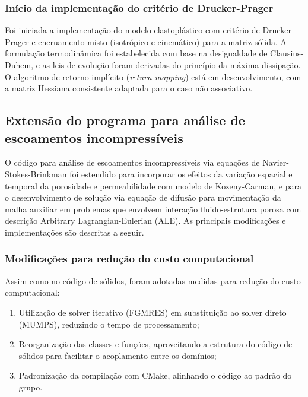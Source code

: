 \subsubsection{Início da implementação do critério de Drucker-Prager}

Foi iniciada a implementação do modelo elastoplástico com critério de Drucker-Prager e encruamento misto (isotrópico e cinemático) para a matriz sólida. A formulação termodinâmica foi estabelecida com base na desigualdade de Clausius-Duhem, e as leis de evolução foram derivadas do princípio da máxima dissipação. O algoritmo de retorno implícito (\textit{return mapping}) está em desenvolvimento, com a matriz Hessiana consistente adaptada para o caso não associativo.

\subsection{Extensão do programa para análise de escoamentos incompressíveis}

O código para análise de escoamentos incompressíveis via equações de Navier-Stokes-Brinkman foi estendido para incorporar os efeitos da variação espacial e temporal da porosidade e permeabilidade com modelo de Kozeny-Carman, e para o desenvolvimento de solução via equação de difusão para movimentação da malha auxiliar em problemas que envolvem interação fluido-estrutura porosa com descrição Arbitrary Lagrangian-Eulerian (ALE). As principais modificações e implementações são descritas a seguir.

\subsubsection{Modificações para redução do custo computacional}

Assim como no código de sólidos, foram adotadas medidas para redução do custo computacional:

\begin{enumerate}
    \item Utilização de solver iterativo (FGMRES) em substituição ao solver direto (MUMPS), reduzindo o tempo de processamento;
    \item Reorganização das classes e funções, aproveitando a estrutura do código de sólidos para facilitar o acoplamento entre os domínios;
    \item Padronização da compilação com CMake, alinhando o código ao padrão do grupo.
\end{enumerate}

